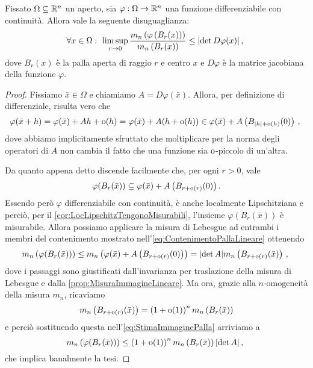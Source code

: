 \begin{lemma}\label{lemma:LimiteDeterminante}
	Fissato $\Omega\subseteq\mathbb R^n$ un aperto, sia $\varphi:\Omega\to\mathbb R^n$ una funzione differenziabile con continuità.
	Allora vale la seguente disuguaglianza:
	\begin{equation*}
		\forall x\in\Omega:\ \limsup_{r\to 0} \frac{ m_n\left(\varphi\left(B_r(x)\right)\right)} {m_n\left(B_r(x)\right)}\le \lvert\det D\varphi(x)\rvert \, \text{, } 
	\end{equation*}
	dove $B_r(x)$ è la palla aperta di raggio $r$ e centro $x$ e $D\varphi$ è la matrice jacobiana della funzione $\varphi$.
\end{lemma}
\begin{proof}
	Fissiamo $\bar x\in\Omega$ e chiamiamo $A=D \varphi(\bar x)$.
	Allora, per definizione di differenziale, risulta vero che
	\begin{equation*}
		\varphi(\bar x+h)=\varphi(\bar x)+Ah+\mathrm{o}(h)=\varphi(\bar x)+A(h+\mathrm{o}(h))\in \varphi(\bar x)+A\left(B_{|h|+\mathrm{o}(h)}(0)\right) \, \text{, }
	\end{equation*}
	dove abbiamo implicitamente sfruttato che moltiplicare per la norma degli operatori di $A$ non cambia il fatto che una funzione sia $\mathrm{o}$-piccolo di un'altra.
	
	Da quanto appena detto discende facilmente che, per ogni $r>0$, vale
	\begin{equation}\label{eq:ContenimentoPallaLineare}
		\varphi(B_r(\bar x))\subseteq \varphi(\bar x)+A\left(B_{r+\mathrm{o}(r)}(0)\right).
	\end{equation}
	Essendo però $\varphi$ differenziabile con continuità, è anche localmente Lipschitziana e perciò, per il \cref{cor:LocLipschitzTengonoMisurabili}, l'insieme $\varphi(B_r(\bar x))$ è misurabile.
	Allora possiamo applicare la misura di Lebesgue ad entrambi i membri del contenimento mostrato nell'\cref{eq:ContenimentoPallaLineare} ottenendo
	\begin{equation}\label{eq:StimaImmaginePalla}
		m_n\left( \varphi(B_r(\bar x)) \right)\le m_n\left(\varphi(\bar x)+A\left(B_{r+\mathrm{o}(r)}(0)\right)\right)
		=\lvert \det A\rvert m_n\left(B_{r+\mathrm{o}(r)}(\bar x)\right)\, \text{, }
	\end{equation}
	dove i passaggi sono giustificati dall'invarianza per traslazione della misura di Lebesgue e dalla \cref{prop:MisuraImmagineLineare}.
	Ma ora, grazie alla $n$-omogeneità della misura $m_n$, ricaviamo
	\begin{equation*} 
		m_n\left(B_{r+\mathrm{o}(r)}(\bar x)\right)=\left(1+\mathrm{o}(1)\right)^n m_n\left( B_r(\bar x)\right)
	\end{equation*}
	e perciò sostituendo questa nell'\cref{eq:StimaImmaginePalla} arriviamo a
	\begin{equation*}
		m_n\left( \varphi(B_r(\bar x)) \right)\le \left(1+\mathrm{o}(1)\right)^n m_n\left( B_r(\bar x)\right)\lvert \det A\rvert \, \text{, }
	\end{equation*}
	che implica banalmente la tesi.
\end{proof}

